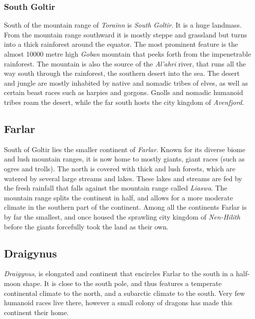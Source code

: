 \subsubsection{South Goltir}

South of the mountain range of \emph{Torainn} is \emph{South Goltir}. It is
a huge landmass. From the mountain range southward it is mostly steppe and
grassland but turns into a thick rainforest around the equator. The most
prominent feature is the almost 10000 metre high \emph{Goban} mountain that
peeks forth from the impenetrable rainforest. The mountain is also the source
of the \emph{Al'ahri} river, that runs all the way south through the
rainforest, the southern desert into the sea. The desert and jungle are mostly
inhabited by native and nomadic tribes of elves, as well as certain beast
races such as harpies and gorgons. Gnolls and nomadic humanoid tribes roam the
desert, while the far south hosts the city kingdom of \emph{Avenfjord}.

\subsection*{Farlar}

South of Goltir lies the smaller continent of \emph{Farlar}. Known for its
diverse biome and lush mountain ranges, it is now home to mostly giants, giant
races (such as ogres and trolls). The north is covered with thick and lush
forests, which are watered by several large streams and lakes. These lakes
and streams are fed by the fresh rainfall that falls against the mountain range
called \emph{Liaswa}. The mountain range splits the continent in half, and
allows for a more moderate climate in the southern part of the continent. Among
all the continents Farlar is by far the smallest, and once housed the sprawling
city kingdom of \emph{Nen-Hilith} before the giants forcefully took the land as
their own.

\subsection*{Draigynus}

\emph{Draigynus}, is elongated and continent that encircles Farlar to the
south in a half-moon shape. It is close to the south pole, and thus features a
temperate continental climate to the north, and a subarctic climate to the
south. Very few humanoid races live there, however a small colony of dragons
has made this continent their home.

